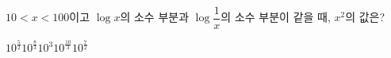 $10<x<100$이고 $\log x$의 소수 부분과 $\log\dfrac{1}{x}$의 소수 부분이 같을 때, $x^2$의 값은?
\begin{choices32}{$10^{\frac{5}{2}}$}{$10^{\frac{8}{3}}$}{$10^3$}{$10^{\frac{10}{3}}$}{$10^{\frac{7}{2}}$}\end{choices32}
